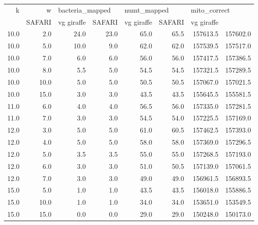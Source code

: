 \begin{tabular}{rrrrrrrr}
\toprule
   k &    w & \multicolumn{2}{l}{bacteria\_mapped} & \multicolumn{2}{l}{numt\_mapped} & \multicolumn{2}{l}{mito\_correct} \\
     &          SAFARI & vg giraffe &      SAFARI & vg giraffe &       SAFARI & vg giraffe \\
\midrule
10.0 &  2.0 &            24.0 &       23.0 &        65.0 &       65.5 &     157613.5 &   157602.0 \\
10.0 &  5.0 &            10.0 &        9.0 &        62.0 &       62.0 &     157539.5 &   157517.0 \\
10.0 &  7.0 &             6.0 &        6.0 &        56.0 &       56.0 &     157417.5 &   157386.5 \\
10.0 &  8.0 &             5.5 &        5.0 &        54.5 &       54.5 &     157321.5 &   157289.5 \\
10.0 & 10.0 &             5.0 &        5.0 &        50.5 &       50.5 &     157067.0 &   157021.5 \\
10.0 & 15.0 &             3.0 &        3.0 &        43.5 &       43.5 &     155645.5 &   155581.5 \\
11.0 &  6.0 &             4.0 &        4.0 &        56.5 &       56.0 &     157335.0 &   157281.5 \\
11.0 &  7.0 &             3.0 &        3.0 &        54.5 &       54.0 &     157225.5 &   157169.0 \\
12.0 &  3.0 &             5.0 &        5.0 &        61.0 &       60.5 &     157462.5 &   157393.0 \\
12.0 &  4.0 &             5.0 &        5.0 &        58.0 &       58.0 &     157369.0 &   157296.5 \\
12.0 &  5.0 &             3.5 &        3.5 &        55.0 &       55.0 &     157268.5 &   157193.0 \\
12.0 &  6.0 &             3.0 &        3.0 &        51.0 &       50.5 &     157139.0 &   157061.5 \\
12.0 &  7.0 &             3.0 &        3.0 &        49.0 &       49.0 &     156961.5 &   156893.5 \\
15.0 &  5.0 &             1.0 &        1.0 &        43.5 &       43.5 &     156018.0 &   155886.5 \\
15.0 & 10.0 &             1.0 &        1.0 &        34.0 &       34.0 &     153651.0 &   153549.5 \\
15.0 & 15.0 &             0.0 &        0.0 &        29.0 &       29.0 &     150248.0 &   150173.0 \\

\end{tabular}
